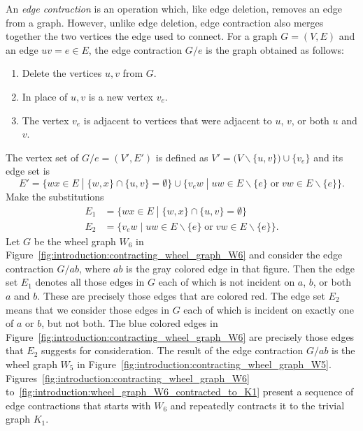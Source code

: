 An \emph{edge contraction} is an operation which, like edge deletion,
removes an edge from a graph. However, unlike edge deletion, edge
contraction also merges together the two vertices the edge used to
connect. For a graph $G = (V, E)$ and an edge $uv = e \in E$, the edge
contraction $G/e$ is the graph obtained as follows:
%
\begin{enumerate}
\item Delete the vertices $u,v$ from $G$.

\item In place of $u,v$ is a new vertex $v_e$.

\item The vertex $v_e$ is adjacent to vertices that were adjacent
  to $u$, $v$, or both $u$ and $v$.
\end{enumerate}
The vertex set of $G/e = (V', E')$ is defined as
$V' = \big(V \backslash \{u,v\}\big) \cup \{v_e\}$ and its edge set is
\[
E'
=
\big\{
wx \in E \;\left.\right|\; \{w,x\} \cap \{u,v\} = \emptyset
\big\}
\cup
\big\{
v_e w
\;\left.\right|\;
uw \in E \backslash \{e\} \;\text{or}\; vw \in E \backslash \{e\}
\big\}.
\]
Make the substitutions
%
\begin{align*}
E_1 &= \big\{
wx \in E \;\left.\right|\; \{w,x\} \cap \{u,v\} = \emptyset \big\} \\
E_2 &= \big\{
v_e w \;\left.\right|\;
uw \in E \backslash \{e\} \;\text{or}\; vw \in E \backslash \{e\} \big\}.
\end{align*}
%
Let $G$ be the wheel graph $W_6$ in
Figure~\ref{fig:introduction:contracting_wheel_graph_W6} and consider
the edge contraction $G/ab$, where $ab$ is the gray colored edge in
that figure. Then the edge set $E_1$ denotes all those edges in $G$
each of which is not incident on $a$, $b$, or both $a$ and $b$. These
are precisely those edges that are colored red. The edge set $E_2$
means that we consider those edges in $G$ each of which is incident on
exactly one of $a$ or $b$, but not both. The blue colored edges in
Figure~\ref{fig:introduction:contracting_wheel_graph_W6} are precisely
those edges that $E_2$ suggests for consideration. The result of the
edge contraction $G/ab$ is the wheel graph $W_5$ in
Figure~\ref{fig:introduction:contracting_wheel_graph_W5}.
Figures~\ref{fig:introduction:contracting_wheel_graph_W6}
to~\ref{fig:introduction:wheel_graph_W6_contracted_to_K1} present a
sequence of edge contractions that starts with $W_6$ and repeatedly
contracts it to the trivial graph $K_1$.

